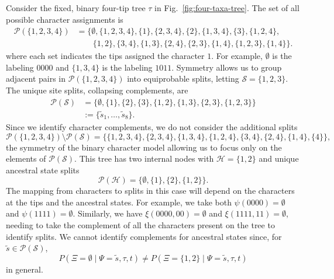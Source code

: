 \documentclass{article}
\newcommand{\siteSplit}{\tilde{s}}
\newcommand{\siteSplitSet}{\mathcal{S}}
\newcommand{\ancestralSplitSet}{\mathcal{H}}
\newcommand{\patternToSplit}{\psi}
\newcommand{\ancestralToSplit}{\xi}
\newcommand{\siteSplitRV}{\Psi}
\newcommand{\ancestralSplitRV}{\Xi}
\begin{document}
Consider the fixed, binary four-tip tree $\tau$ in Fig.~\ref{fig:four-taxa-tree}.
The set of all possible character assignments is
\begin{align*}
\mathcal{P}(\{1,2,3,4\}) &= \{\emptyset, \{1,2,3,4\}, \{1\}, \{2,3,4\}, \{2\}, \{1,3,4\}, \{3\}, \{1,2,4\}, \\
                         &\qquad \{1,2\}, \{3,4\}, \{1,3\}, \{2,4\}, \{2,3\}, \{1,4\}, \{1,2,3\}, \{1,4\}\}.
\end{align*}
where each set indicates the tips assigned the character $1$.
For example, $\emptyset$ is the labeling $0000$ and $\{1,3,4\}$ is the labeling $1011$.
Symmetry allows us to group adjacent pairs in $\mathcal{P}(\{1,2,3,4\})$ into equiprobable splits, letting $\siteSplitSet=\{1,2,3\}$.
The unique site splits, collapsing complements, are
\begin{align*}
    \mathcal{P}(\siteSplitSet) &= \{\emptyset, \{1\}, \{2\}, \{3\}, \{1,2\}, \{1,3\}, \{2,3\}, \{1,2,3\}\} \\
& := \{\siteSplit_1, \ldots, \siteSplit_8\}.
\end{align*}
Since we identify character complements, we do not consider the additional splits
$$
\mathcal{P}(\{1,2,3,4\}) \setminus \mathcal{P}(\siteSplitSet) = \{\{1,2,3,4\}, \{2,3,4\}, \{1,3,4\}, \{1,2,4\}, \{3,4\}, \{2,4\}, \{1,4\}, \{4\}\},
$$
the symmetry of the binary character model allowing us to focus only on the elements of $\mathcal{P}(\siteSplitSet)$.
This tree has two internal nodes with $\ancestralSplitSet=\{1,2\}$ and unique ancestral state splits
$$
\mathcal{P}(\ancestralSplitSet) = \{\emptyset, \{1\}, \{2\}, \{1,2\}\}.
$$
The mapping from characters to splits in this case will depend on the characters at the tips and the ancestral states.
For example, we take both $\patternToSplit(0000)=\emptyset$ and $\patternToSplit(1111)=\emptyset$.
Similarly, we have $\ancestralToSplit(0000, 00) = \emptyset$ and $\ancestralToSplit(1111, 11)=\emptyset$, needing to take the complement of all the characters present on the tree to identify splits.
We cannot identify complements for ancestral states since, for $\siteSplit\in\mathcal{P}(\siteSplitSet)$,
$$
P(\ancestralSplitRV=\emptyset \mid \siteSplitRV=\siteSplit, \tau, t)\neq P(\ancestralSplitRV=\{1,2\} \mid \siteSplitRV=\siteSplit, \tau, t)
$$
in general.
\end{document}
